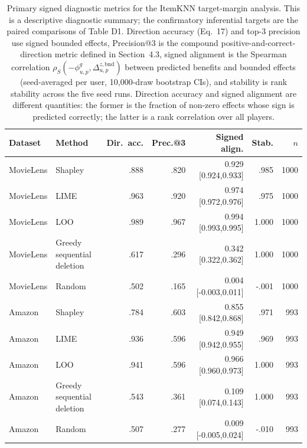 \begin{table}[!htbp]
\centering\scriptsize
\setlength{\tabcolsep}{3pt}
\caption{Primary signed diagnostic metrics for the ItemKNN target-margin analysis. This is a descriptive diagnostic summary; the confirmatory inferential targets are the paired comparisons of Table D1. Direction accuracy (Eq.~17) and top-$3$ precision use signed bounded effects, Precision@3 is the compound positive-and-correct-direction metric defined in Section~4.3, signed alignment is the Spearman correlation $\rho_S(-\phi^g_{u,p},\Delta^{z,\mathrm{bnd}}_{u,p})$ between predicted benefits and bounded effects (seed-averaged per user, 10,000-draw bootstrap CIs), and stability is rank stability across the five seed runs. Direction accuracy and signed alignment are different quantities: the former is the fraction of non-zero effects whose sign is predicted correctly; the latter is a rank correlation over all players.}
\label{tab:app-diagnostics}
\begin{tabular}{@{}p{}p{}rrrrr@{}}
\toprule
Dataset & Method & Dir.\ acc. & Prec.@3 & Signed align. & Stab. & $n$ \\
\midrule
MovieLens & Shapley & .888 & .820 & 0.929 [0.924,0.933] & .985 & 1000 \\
MovieLens & LIME & .963 & .920 & 0.974 [0.972,0.976] & .975 & 1000 \\
MovieLens & LOO & .989 & .967 & 0.994 [0.993,0.995] & 1.000 & 1000 \\
MovieLens & Greedy sequential deletion & .617 & .296 & 0.342 [0.322,0.362] & 1.000 & 1000 \\
MovieLens & Random & .502 & .165 & 0.004 [-0.003,0.011] & -.001 & 1000 \\
Amazon & Shapley & .784 & .603 & 0.855 [0.842,0.868] & .971 & 993 \\
Amazon & LIME & .936 & .596 & 0.949 [0.942,0.955] & .969 & 993 \\
Amazon & LOO & .941 & .596 & 0.966 [0.960,0.973] & 1.000 & 993 \\
Amazon & Greedy sequential deletion & .543 & .361 & 0.109 [0.074,0.143] & 1.000 & 993 \\
Amazon & Random & .507 & .277 & 0.009 [-0.005,0.024] & -.010 & 993 \\
\bottomrule
\end{tabular}
\end{table}
